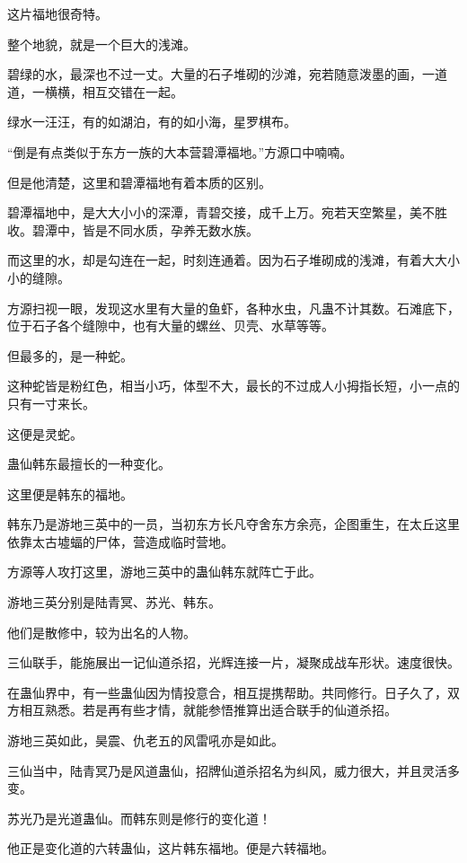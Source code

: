 
\begin{this_body}

这片福地很奇特。

整个地貌，就是一个巨大的浅滩。

碧绿的水，最深也不过一丈。大量的石子堆砌的沙滩，宛若随意泼墨的画，一道道，一横横，相互交错在一起。

绿水一汪汪，有的如湖泊，有的如小海，星罗棋布。

“倒是有点类似于东方一族的大本营碧潭福地。”方源口中喃喃。

但是他清楚，这里和碧潭福地有着本质的区别。

碧潭福地中，是大大小小的深潭，青碧交接，成千上万。宛若天空繁星，美不胜收。碧潭中，皆是不同水质，孕养无数水族。

而这里的水，却是勾连在一起，时刻连通着。因为石子堆砌成的浅滩，有着大大小小的缝隙。

方源扫视一眼，发现这水里有大量的鱼虾，各种水虫，凡蛊不计其数。石滩底下，位于石子各个缝隙中，也有大量的螺丝、贝壳、水草等等。

但最多的，是一种蛇。

这种蛇皆是粉红色，相当小巧，体型不大，最长的不过成人小拇指长短，小一点的只有一寸来长。

这便是灵蛇。

蛊仙韩东最擅长的一种变化。

这里便是韩东的福地。

韩东乃是游地三英中的一员，当初东方长凡夺舍东方余亮，企图重生，在太丘这里依靠太古墟蝠的尸体，营造成临时营地。

方源等人攻打这里，游地三英中的蛊仙韩东就阵亡于此。

游地三英分别是陆青冥、苏光、韩东。

他们是散修中，较为出名的人物。

三仙联手，能施展出一记仙道杀招，光辉连接一片，凝聚成战车形状。速度很快。

在蛊仙界中，有一些蛊仙因为情投意合，相互提携帮助。共同修行。日子久了，双方相互熟悉。若是再有些才情，就能参悟推算出适合联手的仙道杀招。

游地三英如此，昊震、仇老五的风雷吼亦是如此。

三仙当中，陆青冥乃是风道蛊仙，招牌仙道杀招名为纠风，威力很大，并且灵活多变。

苏光乃是光道蛊仙。而韩东则是修行的变化道！

他正是变化道的六转蛊仙，这片韩东福地。便是六转福地。


\end{this_body}
